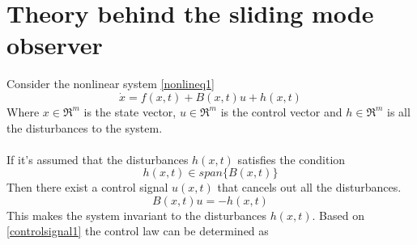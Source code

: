 \documentclass{LTHthesis}
\begin{document}
\section{Theory behind the sliding mode observer}
Consider the nonlinear system \eqref{nonlineq1}
\begin{equation} \label{nonlineq1}
\dot{x}=f(x,t)+B(x,t)u+h(x,t)
\end{equation}
Where $x \in \Re^m $ is the state vector, $u \in \Re^m $ is the control vector and $h \in \Re^m $  is all the disturbances to the system.\\ \\
If it's assumed that the disturbances  $h(x,t)$ satisfies the condition
\begin{equation} \label{distrubanceSpan}
h(x,t)\in span\{B(x,t)\}
\end{equation}
Then there exist a control signal $u(x,t)$ that cancels out all the disturbances.
\begin{equation}\label{controlsignal1}
B(x,t)u=-h(x,t)
\end{equation}
This makes the system invariant to the disturbances $h(x,t)$. 
Based on \eqref{controlsignal1} the control law can be determined as 
\end{document}
